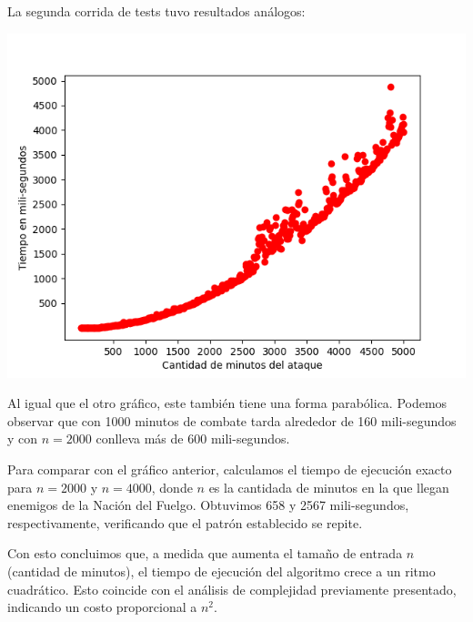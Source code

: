 \documentclass{article}
\begin{document}
La segunda corrida de tests tuvo resultados análogos:

\includegraphics[scale=0.69]{graficoComplejidad.png}

Al igual que el otro gráfico, este también tiene una forma parabólica. Podemos observar que con 1000 minutos de combate tarda alrededor de 160 mili-segundos y con $n = 2000$ conlleva más de 600 mili-segundos. 

Para comparar con el gráfico anterior, calculamos el tiempo de ejecución exacto para $n = 2000$ y $n = 4000$, donde $n$ es la cantidada de minutos en la que llegan enemigos de la Nación del Fuelgo. Obtuvimos 658 y 2567 mili-segundos, respectivamente, verificando que el patrón establecido se repite.

Con esto concluimos que, a medida que aumenta el tamaño de entrada $n$ (cantidad de minutos), el tiempo de ejecución del algoritmo crece a un ritmo cuadrático. Esto coincide con el análisis de complejidad previamente presentado, indicando un costo proporcional a $n^2$.
\end{document}

